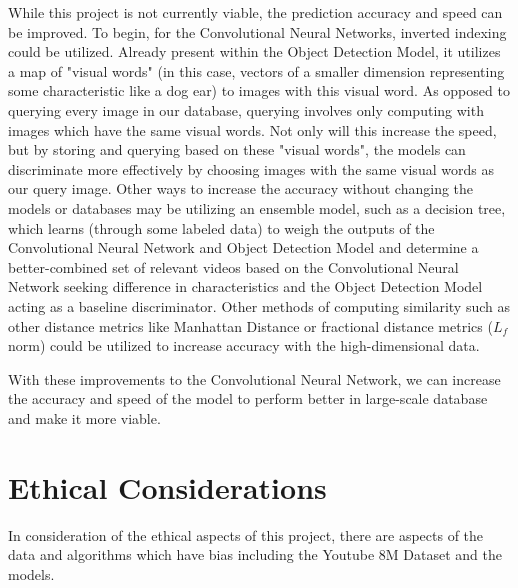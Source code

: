 \documentclass[10pt,twocolumn]{article}
\begin{document}
While this project is not currently viable, the prediction accuracy and speed can be improved. To begin, for the Convolutional Neural Networks, inverted indexing could be utilized. Already present within the Object Detection Model, it utilizes a map of "visual words" (in this case, vectors of a smaller dimension representing some characteristic like a dog ear) to images with this visual word. As opposed to querying every image in our database, querying involves only computing with images which have the same visual words. Not only will this increase the speed, but by storing and querying based on these "visual words", the models can discriminate more effectively by choosing images with the same visual words as our query image. Other ways to increase the accuracy without changing the models or databases may be utilizing an ensemble model, such as a decision tree, which learns (through some labeled data) to weigh the outputs of the Convolutional Neural Network and Object Detection Model and determine a better-combined set of relevant videos based on the Convolutional Neural Network seeking difference in characteristics and the Object Detection Model acting as a baseline discriminator. Other methods of computing similarity such as other distance metrics like Manhattan Distance or fractional distance metrics ($L_f$ norm) \cite{Goos2001} could be utilized to increase accuracy with the high-dimensional data.

With these improvements to the Convolutional Neural Network, we can increase the accuracy and speed of the model to perform better in large-scale database and make it more viable.

\section {Ethical Considerations}


In consideration of the ethical aspects of this project, there are aspects of the data and algorithms which have bias including the Youtube 8M Dataset and the models.
\end{document}
